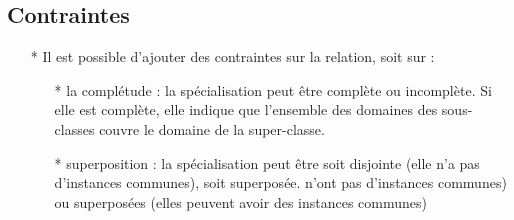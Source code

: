 \documentclass[12pt]{article}
\begin{document}
	\subsection{Contraintes}
	\begin{itemize}
		\item[* ] Il est possible d'ajouter des contraintes sur la relation, soit
		sur :
		\begin{itemize}
			\item[* ] la complétude : la spécialisation peut être complète ou
			incomplète. Si elle est complète, elle indique que l'ensemble des
			domaines des sous-classes couvre le domaine de la super-classe.
			\item[* ] superposition : la spécialisation peut être soit disjointe (elle n'a pas d'instances communes), soit superposée.
			n'ont pas d'instances communes) ou superposées (elles peuvent avoir des
			instances communes)
			

\end{itemize}
\end{itemize}
\end{document}
